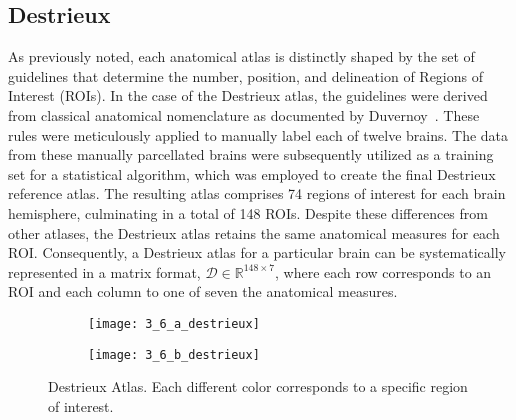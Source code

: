 \subsection{Destrieux}
As previously noted, each anatomical atlas is distinctly shaped by the set of
guidelines that determine the number, position, and delineation of Regions of
Interest (ROIs). In the case of the Destrieux atlas, the guidelines were derived
from classical anatomical nomenclature as documented by
Duvernoy~. These rules were meticulously applied
to manually label each of twelve brains. The data from these manually
parcellated brains were subsequently utilized as a training set for a
statistical algorithm, which was employed to create the final Destrieux
reference atlas. The resulting atlas comprises 74 regions of interest for each
brain hemisphere, culminating in a total of 148 ROIs. Despite these differences
from other atlases, the Destrieux atlas retains the same anatomical measures for
each ROI. Consequently, a Destrieux atlas for a particular brain can be
systematically represented in a matrix format, $\mathcal{D} \in \mathbb{R}^{148
\times 7}$, where each row corresponds to an ROI and each column to one of seven
the anatomical measures.
\begin{figure}[h]
    \begin{subfigure}[h]{.5\linewidth}
        \texttt{[image: 3\_6\_a\_destrieux]}
    \end{subfigure}%
    \begin{subfigure}[h]{0.5\linewidth}
        \texttt{[image: 3\_6\_b\_destrieux]}
    \end{subfigure}
    \caption[Destrieux Atlas]{Destrieux Atlas. Each different color corresponds
    to a specific region of interest.}
\end{figure}